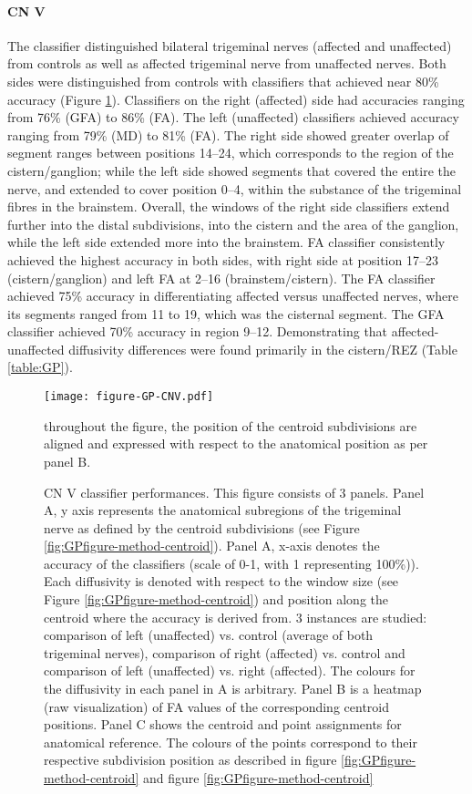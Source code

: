 \paragraph{CN V}
The classifier distinguished bilateral trigeminal nerves (affected and unaffected) from controls as well as affected trigeminal nerve from unaffected nerves. Both sides were distinguished from controls with classifiers that achieved near 80\% accuracy (Figure \ref{fig:GPfigure4}). 
Classifiers on the right (affected) side had accuracies ranging from 76\% (GFA) to 86\% (FA). The left (unaffected) classifiers achieved accuracy ranging from 79\% (MD) to 81\% (FA). The right side showed greater overlap of segment ranges between positions 14--24, which corresponds to the region of the cistern/ganglion; while the left side showed segments that covered the entire the nerve, and extended to cover position 0--4, within the substance of the trigeminal fibres in the brainstem. Overall, the windows of the right side classifiers extend further into the distal subdivisions, into the cistern and the area of the ganglion, while the left side extended more into the brainstem. FA classifier consistently achieved the highest accuracy in both sides, with right side at position 17--23 (cistern/ganglion) and left FA at 2--16 (brainstem/cistern).
The FA classifier achieved 75\% accuracy in differentiating affected versus unaffected nerves, where its segments ranged from 11 to 19, which was the cisternal segment. The GFA classifier achieved 70\% accuracy in region 9--12. Demonstrating that affected-unaffected diffusivity differences were found primarily in the cistern/REZ (Table \ref{table:GP}).

\begin{figure}[p]
\centering
\texttt{[image: figure-GP-CNV.pdf]}
\caption[CN V classifier performances.]{CN V classifier performances. This figure consists of 3 panels. Panel A, y axis represents the anatomical subregions of the trigeminal nerve as defined by the centroid subdivisions (see Figure \ref{fig:GPfigure-method-centroid}). Panel A, x-axis denotes the accuracy of the classifiers (scale of 0-1, with 1 representing 100\%)). Each diffusivity is denoted with respect to the window size (see Figure \ref{fig:GPfigure-method-centroid}) and position along the centroid where the accuracy is derived from. 3 instances are studied: comparison of left (unaffected) vs. control (average of both trigeminal nerves), comparison of right (affected) vs. control and comparison of left (unaffected) vs. right (affected). The colours for the diffusivity in each panel in A is arbitrary. Panel B is a heatmap (raw visualization) of FA values of the corresponding centroid positions. Panel C shows the centroid and point assignments for anatomical reference. The colours of the points correspond to their respective subdivision position as described in figure \ref{fig:GPfigure-method-centroid} and figure \ref{fig:GPfigure-method-centroid}} throughout the figure, the position of the centroid subdivisions are aligned and expressed with respect to the anatomical position as per panel B.
\label{fig:GPfigure4}
\end{figure}

